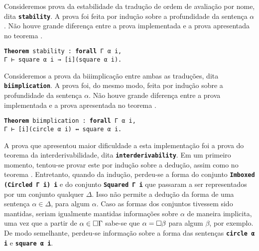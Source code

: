 \vspace{.5\baselineskip}
Consideremos prova da estabilidade da tradução de ordem de avaliação por nome, dita \texttt{\noindent\footnotesize\textbf{stability}}.
A prova foi feita por indução sobre a profundidade da sentença $\alpha$.
Não houve grande diferença entre a prova implementada e a prova apresentada no teorema .

\vspace{.5\baselineskip}
\begin{tcolorbox}[enhanced jigsaw, breakable, sharp corners, colframe=black, colback=white, boxrule=0.5pt, left=1.5mm, right=1.5mm, top=1.5mm, bottom=1.5mm]
\texttt{\noindent\footnotesize\textbf{Theorem} stability : \textbf{forall} Γ α i,\\Γ ⊢ square α i → [i](square α i).}
\end{tcolorbox}

\vspace{.5\baselineskip}
Consideremos a prova da biiimplicação entre ambas as traduções, dita \texttt{\noindent\footnotesize\textbf{biimplication}}.
A prova foi, do mesmo modo, feita por indução sobre a profundidade da sentença $\alpha$.
Não houve grande diferença entre a prova implementada e a prova apresentada no teorema .

\vspace{.5\baselineskip}
\begin{tcolorbox}[enhanced jigsaw, breakable, sharp corners, colframe=black, colback=white, boxrule=0.5pt, left=1.5mm, right=1.5mm, top=1.5mm, bottom=1.5mm]
\texttt{\noindent\footnotesize\textbf{Theorem} biimplication : \textbf{forall} Γ α i,\\Γ ⊢ [i](circle α i) ↔ square α i.}
\end{tcolorbox}

\vspace{.5\baselineskip}
A prova que apresentou maior dificuldade a esta implementação foi a prova do teorema da interderivabilidade, dita \texttt{\noindent\footnotesize\textbf{interderivability}}.
Em um primeiro momento, tentou-se provar este por indução sobre a dedução, assim como no teorema .
Entretanto, quando da indução, perdeu-se a forma do conjunto \texttt{\noindent\footnotesize\textbf{Imboxed (Circled Γ i) i}} e do conjunto \texttt{\noindent\footnotesize\textbf{Squared Γ i}} que passaram a ser representados por um conjunto qualquer $\Delta$.
Isso não permite a dedução da forma de uma sentença $\alpha\in\Delta$, para algum $\alpha$.
Caso as formas dos conjuntos tivessem sido mantidas, seriam igualmente mantidas informações sobre $\alpha$ de maneira implicita, uma vez que a partir de $\alpha\in\Box\Gamma$ sabe-se que $\alpha=\Box\beta$ para algum $\beta$, por exemplo.
De modo semelhante, perdeu-se informação sobre a forma das sentenças \texttt{\noindent\footnotesize\textbf{circle α i}} e \texttt{\noindent\footnotesize\textbf{square α i}}.

